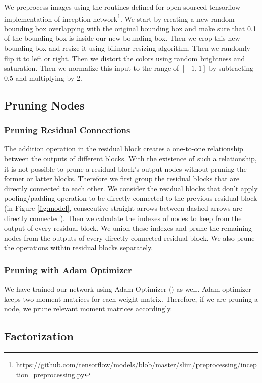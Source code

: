 We preprocess images using the routines defined for open sourced tensorflow implementation of inception network\footnote{\url{https://github.com/tensorflow/models/blob/master/slim/preprocessing/inception_preprocessing.py}}. We start by creating a new random bounding box overlapping with the original bounding box and make sure that 0.1 of the bounding box is inside our new bounding box. Then we crop this new bounding box and resize it using bilinear resizing algorithm. Then we randomly flip it to left or right. Then we distort the colors using random brightness and saturation. Then we normalize this input to the range of $[-1,1]$ by subtracting 0.5 and multiplying by 2. 

\subsection{Pruning Nodes}
\subsubsection{Pruning Residual Connections}
The addition operation in the residual block creates a one-to-one relationship between the outputs of different blocks. With the existence of such a relationship, it is not possible to prune a residual block's output nodes without pruning the former or latter blocks. Therefore we first group the residual blocks that are directly connected to each other. We consider the residual blocks that don't apply pooling/padding operation to be directly connected to the previous residual block (in Figure \ref{fig:model}, consecutive straight arrows between dashed arrows are directly connected). Then we calculate the indexes of nodes to keep from the output of every residual block. We union these indexes and prune the remaining nodes from the outputs of every directly connected residual block. We also prune the operations within residual blocks separately. 

\subsubsection{Pruning with Adam Optimizer}
We have trained our network using Adam Optimizer (\cite{kingma2014adam}) as well. Adam optimizer keeps two moment matrices for each weight matrix. Therefore, if we are pruning a node, we prune relevant moment matrices accordingly.

\subsection{Factorization}

